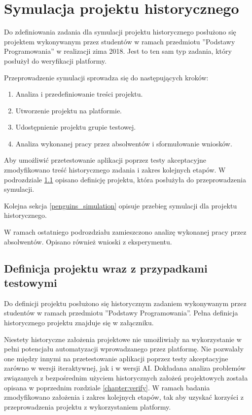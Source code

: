 \section{Symulacja projektu historycznego}
\label{research_penguins}

Do zdefiniowania zadania dla symulacji projektu historycznego posłużono się projektem wykonywanym przez studentów w ramach przedmiotu ”Podstawy Programowania” w realizacji zima 2018.
Jest to ten sam typ zadania, który posłużył do weryfikacji platformy.

Przeprowadzenie symulacji sprowadza się do następujących kroków:
\begin{enumerate}
    \item Analiza i przedefiniowanie treści projektu.
    \item Utworzenie projektu na platformie.
    \item Udostępnienie projektu grupie testowej.
    \item Analiza wykonanej pracy przez absolwentów i sformułowanie wniosków.
\end{enumerate}

Aby umożliwić przetestowanie aplikacji poprzez testy akceptacyjne zmodyfikowano treść historycznego zadania i zakres kolejnych etapów.
W podrozdziale \ref{penguins_project_definition} opisano definicję projektu, która posłużyła do przeprowadzenia symulacji.

Kolejna sekcja \ref{penguins_simulation} opisuje przebieg symulacji dla projektu historycznego.

W ramach ostatniego podrozdziału zamieszczono analizę wykonanej pracy przez absolwentów.
Opisano również wnioski z eksperymentu.


\subsection{Definicja projektu wraz z przypadkami testowymi}
\label{penguins_project_definition}

Do definicji projektu posłużono się historycznym zadaniem wykonywanym przez studentów w ramach przedmiotu ”Podstawy Programowania”.
Pełna definicja historycznego projektu znajduje się w załączniku.

Niestety historyczne założenia projektowe nie umożliwiały na wykorzystanie w pełni potencjału automatyzacji wprowadzanego przez platformę.
Nie pozwalały one między innymi na przetestowanie aplikacji poprzez testy akceptacyjne zarówno w wersji iteraktywnej, jak i w wersji AI.
Dokładana analiza problemów związanych z bezpośrednim użyciem historycznych założeń projektowych została opisana w poprzednim rozdziale \ref{chapter:verify}.
W ramach badania zmodyfikowano założenia i zakres kolejnych etapów, tak aby uzyskać korzyści z przeprowadzenia projektu z wykorzystaniem platformy.

